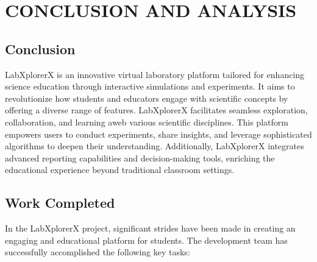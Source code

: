 \chapter{CONCLUSION AND ANALYSIS}
\section{Conclusion}
LabXplorerX is an innovative virtual laboratory platform tailored for enhancing science education through interactive simulations and experiments. It aims to revolutionize how students and educators engage with scientific concepts by offering a diverse range of features. LabXplorerX facilitates seamless exploration, collaboration, and learning aweb various scientific disciplines. This platform empowers users to conduct experiments, share insights, and leverage sophisticated algorithms to deepen their understanding. Additionally, LabXplorerX integrates advanced reporting capabilities and decision-making tools, enriching the educational experience beyond traditional classroom settings.
\section{Work Completed}

In the LabXplorerX project, significant strides have been made in creating an engaging and educational platform for students. The development team has successfully accomplished the following key tasks:

